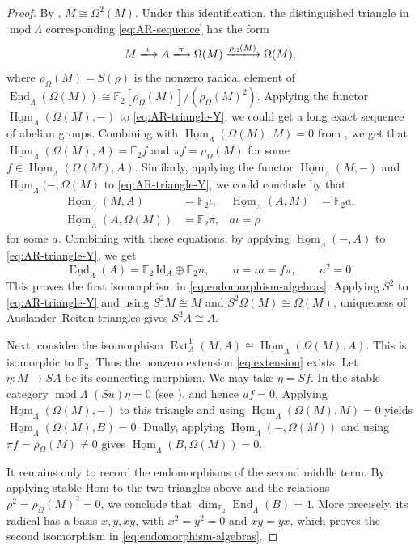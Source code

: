\documentclass[a4paper,reqno,10pt]{amsart}
\numberwithin{equation}{section}
\DeclareMathOperator{\modu}{mod}
\DeclareMathOperator{\End}{End}
\DeclareMathOperator{\Hom}{Hom}
\newcommand{\kk}{\mathbb F_2}
\newcommand{\Lam}{\Lambda}
\newcommand{\ol}[1]{\underline{#1}}
\begin{document}
\begin{proof}
By , $M\cong \Omega^2(M)$. Under this identification, the distinguished triangle in $\ol{\modu}\Lam$ corresponding 
\eqref{eq:AR-sequence} has the form
\begin{equation}\label{eq:AR-triangle-Y}
 M\xlongrightarrow{\iota}A\xlongrightarrow{\pi}\Omega(M)
 \xlongrightarrow{\rho_\Omega(M)}\Omega(M),
\end{equation}
where $\rho_\Omega(M)=S(\rho)$ is the nonzero radical element of
$\ol{\End}_\Lam(\Omega(M))\cong\kk[\rho_\Omega(M)]/(\rho_\Omega(M)^2)$. Applying the 
functor $\ol{\Hom}_\Lam(\Omega(M),-)$ to \eqref{eq:AR-triangle-Y}, we could get a long exact sequence of abelian groups. Combining with 
$
 \ol{\Hom}_\Lam(\Omega(M),M)=0
$
from , we get that $ \ol{\Hom}_\Lam(\Omega(M),A)=\kk f$ and $\pi f=\rho_\Omega(M)$ for some $f\in\ol{\Hom}_\Lambda(\Omega(M),A)$. Similarly, applying the 
functor $\ol{\Hom}_\Lambda(M,-)$ and $\ol{\Hom}_\Lam(-,\Omega(M)$ to \eqref{eq:AR-triangle-Y},  we could conclude by  that
\[
\begin{aligned}
 \ol{\Hom}_\Lam(M,A)&=\kk\iota,&
 \ol{\Hom}_\Lam(A,M)&=\kk a,\\
 \ol{\Hom}_\Lam(A,\Omega(M))&=\kk\pi,& a\iota=\rho
&\end{aligned}
\]
for some  $a$. Combining with these equations, by applying $\ol{\Hom}_\Lambda(-,A)$ to \eqref{eq:AR-triangle-Y}, we get 
\[
 \ol{\End}_\Lam(A)
 =\kk\,\mathrm{Id}_A\oplus\kk n,
 \qquad n=\iota a=f\pi,\qquad n^2=0.
\]
This proves the first isomorphism in \eqref{eq:endomorphism-algebras}.
Applying $S^2$ to \eqref{eq:AR-triangle-Y} and using $S^2M\cong M$ and
$S^2\Omega(M)\cong \Omega(M)$, uniqueness of Auslander--Reiten triangles gives
$S^2A\cong A$.

Next,
consider the isomorphism $
 \operatorname{Ext}^1_\Lam(M,A)
\cong\ol{\Hom}_\Lam(\Omega(M),A)$. This is isomorphic to $\kk$.
Thus the nonzero extension \eqref{eq:extension} exists. Let $\eta:M\longrightarrow SA$ be its connecting morphism.
We may take $\eta=Sf$. In the stable category $\ol{\modu}\Lam$
$(Su)\eta=0$ (see ), and hence $uf=0$. Applying
$\ol{\Hom}_\Lam(\Omega(M),-)$ to this triangle and using
$\ol{\Hom}_\Lam(\Omega(M),M)=0$ yields
$\ol{\Hom}_\Lam(\Omega(M),B)=0$. Dually, applying
$\ol{\Hom}_\Lam(-,\Omega(M))$ and using $\pi f=\rho_\Omega(M)\ne0$ gives
$\ol{\Hom}_\Lam(B,\Omega(M))=0$.

It remains only to record the endomorphisms of the second middle term.
By applying stable Hom to the two triangles above and the relations $\rho^2=\rho_\Omega(M)^2=0$, we conclude that
$ \dim_{\kk}\ol{\End}_\Lam(B)=4.
$
More precisely, its radical has a basis $x,y,xy$, with $x^2=y^2=0$ and $xy=yx$,
which proves the second isomorphism in
\eqref{eq:endomorphism-algebras}. 


\end{proof}
\end{document}
